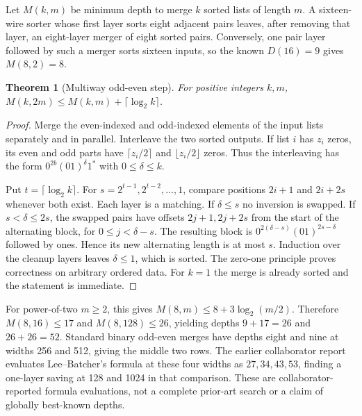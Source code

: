 \documentclass[11pt]{article}
\newtheorem{theorem}{Theorem}[section]
\begin{document}
Let $M(k,m)$ be minimum depth to merge $k$ sorted lists of length $m$. A sixteen-wire sorter whose first layer sorts eight adjacent pairs leaves, after removing that layer, an eight-layer merger of eight sorted pairs. Conversely, one pair layer followed by such a merger sorts sixteen inputs, so the known $D(16)=9$ gives $M(8,2)=8$.

\begin{theorem}[Multiway odd-even step]\label{thm:merge}
For positive integers $k,m$, $M(k,2m)\le M(k,m)+\lceil\log_2 k\rceil$.
\end{theorem}
\begin{proof}
Merge the even-indexed and odd-indexed elements of the input lists separately and in parallel. Interleave the two sorted outputs. If list $i$ has $z_i$ zeros, its even and odd parts have $\lceil z_i/2\rceil$ and $\lfloor z_i/2\rfloor$ zeros. Thus the interleaving has the form $0^{2b}(01)^\delta1^*$ with $0\le\delta\le k$.

Put $t=\lceil\log_2 k\rceil$. For $s=2^{t-1},2^{t-2},\ldots,1$, compare positions $2i+1$ and $2i+2s$ whenever both exist. Each layer is a matching. If $\delta\le s$ no inversion is swapped. If $s<\delta\le2s$, the swapped pairs have offsets $2j+1,2j+2s$ from the start of the alternating block, for $0\le j<\delta-s$. The resulting block is $0^{2(\delta-s)}(01)^{2s-\delta}$ followed by ones. Hence its new alternating length is at most $s$. Induction over the cleanup layers leaves $\delta\le1$, which is sorted. The zero-one principle proves correctness on arbitrary ordered data. For $k=1$ the merge is already sorted and the statement is immediate.
\end{proof}

For power-of-two $m\ge2$, this gives $M(8,m)\le8+3\log_2(m/2)$. Therefore $M(8,16)\le17$ and $M(8,128)\le26$, yielding depths $9+17=26$ and $26+26=52$. Standard binary odd-even merges have depths eight and nine at widths 256 and 512, giving the middle two rows. The earlier collaborator report evaluates Lee--Batcher's formula at these four widths as $27,34,43,53$, finding a one-layer saving at 128 and 1024 in that comparison. These are collaborator-reported formula evaluations, not a complete prior-art search or a claim of globally best-known depths.
\end{document}
